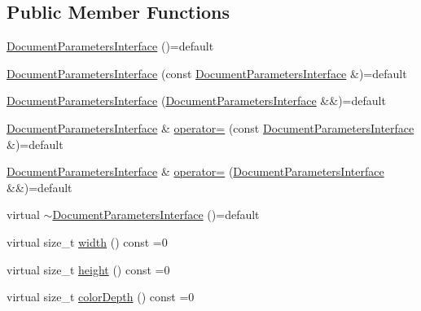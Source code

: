 \subsection*{Public Member Functions}
\begin{DoxyCompactItemize}
\item 
\hyperlink{classGraphicalEditorCore_1_1DocumentParametersInterface_aea8d5f5d01c0046d0bc2adad22487b23}{Document\+Parameters\+Interface} ()=default
\item 
\hyperlink{classGraphicalEditorCore_1_1DocumentParametersInterface_a95795d8f0e1cb69c18b468739325a0bb}{Document\+Parameters\+Interface} (const \hyperlink{classGraphicalEditorCore_1_1DocumentParametersInterface}{Document\+Parameters\+Interface} \&)=default
\item 
\hyperlink{classGraphicalEditorCore_1_1DocumentParametersInterface_a72b15c164f9f457c29d314ba6762fd84}{Document\+Parameters\+Interface} (\hyperlink{classGraphicalEditorCore_1_1DocumentParametersInterface}{Document\+Parameters\+Interface} \&\&)=default
\item 
\hyperlink{classGraphicalEditorCore_1_1DocumentParametersInterface}{Document\+Parameters\+Interface} \& \hyperlink{classGraphicalEditorCore_1_1DocumentParametersInterface_aa5a6d4d881b9812f8406f01ec1e20e50}{operator=} (const \hyperlink{classGraphicalEditorCore_1_1DocumentParametersInterface}{Document\+Parameters\+Interface} \&)=default
\item 
\hyperlink{classGraphicalEditorCore_1_1DocumentParametersInterface}{Document\+Parameters\+Interface} \& \hyperlink{classGraphicalEditorCore_1_1DocumentParametersInterface_a43e956fc79f52aff91ea8e2d0b952e5c}{operator=} (\hyperlink{classGraphicalEditorCore_1_1DocumentParametersInterface}{Document\+Parameters\+Interface} \&\&)=default
\item 
virtual \hyperlink{classGraphicalEditorCore_1_1DocumentParametersInterface_a17f379e6cde775c74283e90d046372e4}{$\sim$\+Document\+Parameters\+Interface} ()=default
\item 
virtual size\+\_\+t \hyperlink{classGraphicalEditorCore_1_1DocumentParametersInterface_a8e96d1aa50d0b2bd3ef21fafaeaa4261}{width} () const =0
\item 
virtual size\+\_\+t \hyperlink{classGraphicalEditorCore_1_1DocumentParametersInterface_a1a3f45e27f2c9b11d04b2fe562323bb2}{height} () const =0
\item 
virtual size\+\_\+t \hyperlink{classGraphicalEditorCore_1_1DocumentParametersInterface_aa52f8402816b4fefb9e3101b25e71f5a}{color\+Depth} () const =0
\end{DoxyCompactItemize}


